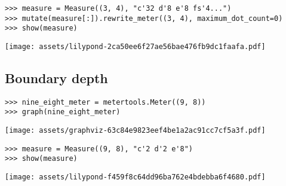 \begin{singlespacing}
\vspace{-0.5\baselineskip}
\begin{lstlisting}
>>> measure = Measure((3, 4), "c'32 d'8 e'8 fs'4...")
>>> mutate(measure[:]).rewrite_meter((3, 4), maximum_dot_count=0)
>>> show(measure)
\end{lstlisting}
\texttt{[image: assets/lilypond-2ca50ee6f27ae56bae476fb9dc1faafa.pdf]}
\end{singlespacing}

\subsection{Boundary depth} %

\begin{comment}
<abjad>
nine_eight_meter = metertools.Meter((9, 8))
graph(nine_eight_meter)
</abjad>
\end{comment}

\begin{singlespacing}
\vspace{-0.5\baselineskip}
\begin{lstlisting}
>>> nine_eight_meter = metertools.Meter((9, 8))
>>> graph(nine_eight_meter)
\end{lstlisting}
\texttt{[image: assets/graphviz-63c84e9823eef4be1a2ac91cc7cf5a3f.pdf]}
\end{singlespacing}

\begin{comment}
<abjad>
measure = Measure((9, 8), "c'2 d'2 e'8")
show(measure)
</abjad>
\end{comment}

\begin{singlespacing}
\vspace{-0.5\baselineskip}
\begin{lstlisting}
>>> measure = Measure((9, 8), "c'2 d'2 e'8")
>>> show(measure)
\end{lstlisting}
\texttt{[image: assets/lilypond-f459f8c64dd96ba762e4bdebba6f4680.pdf]}
\end{singlespacing}

\begin{comment}
<abjad>
mutate(measure[:]).rewrite_meter(nine_eight_meter)
show(measure)
</abjad>
\end{comment}

